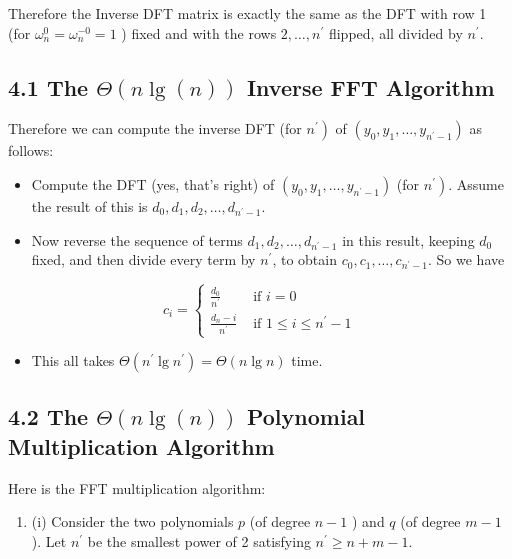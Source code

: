 Therefore the Inverse DFT matrix is exactly the same as the DFT with row 1 (for $\omega_{n}^{0}=\omega_{n}^{-0}=1$ ) fixed and with the rows $2, \ldots, n^{\prime}$ flipped, all divided by $n^{\prime}$.

\subsection*{4.1 The $\Theta(n \lg (n))$ Inverse FFT Algorithm}
Therefore we can compute the inverse DFT (for $\left.n^{\prime}\right)$ of $\left(y_{0}, y_{1}, \ldots, y_{n^{\prime}-1}\right)$ as follows:

\begin{itemize}
  \item Compute the DFT (yes, that's right) of $\left(y_{0}, y_{1}, \ldots, y_{n^{\prime}-1}\right)$ (for $\left.n^{\prime}\right)$. Assume the result of this is $d_{0}, d_{1}, d_{2}, \ldots, d_{n^{\prime}-1}$.
  \item Now reverse the sequence of terms $d_{1}, d_{2}, \ldots, d_{n^{\prime}-1}$ in this result, keeping $d_{0}$ fixed, and then divide every term by $n^{\prime}$, to obtain $c_{0}, c_{1}, \ldots, c_{n^{\prime}-1}$. So we have
\end{itemize}

$$
c_{i}= \begin{cases}\frac{d_{0}}{n^{\prime}} & \text { if } i=0 \\ \frac{d_{n}-i}{n^{\prime}} & \text { if } 1 \leq i \leq n^{\prime}-1\end{cases}
$$

\begin{itemize}
  \item This all takes $\Theta\left(n^{\prime} \lg n^{\prime}\right)=\Theta(n \lg n)$ time.
\end{itemize}

\subsection*{4.2 The $\Theta(n \lg (n))$ Polynomial Multiplication Algorithm}
Here is the FFT multiplication algorithm:

\begin{enumerate}
  \item (i) Consider the two polynomials $p$ (of degree $n-1$ ) and $q$ (of degree $m-1$ ). Let $n^{\prime}$ be the smallest power of 2 satisfying $n^{\prime} \geq n+m-1$.
\end{enumerate}

